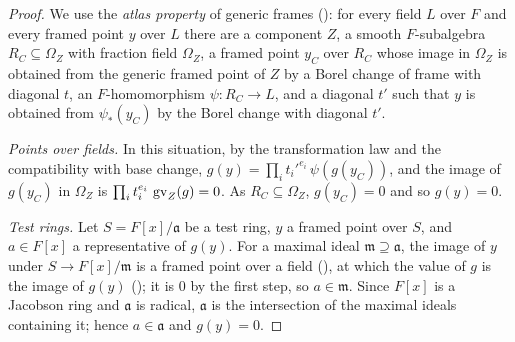 \begin{proof}
We use the \emph{atlas property} of generic frames (): for
every field $L$ over $F$ and every framed point $y$ over $L$ there are a component $Z$, a smooth
$F$-subalgebra $R_C\subseteq\Omega_Z$ with fraction field $\Omega_Z$, a framed point $y_C$ over $R_C$ whose
image in $\Omega_Z$ is obtained from the generic framed point of $Z$ by a Borel change of frame with
diagonal $t$, an $F$-homomorphism $\psi\colon R_C\to L$, and a diagonal $t'$ such that $y$ is obtained from
$\psi_*(y_C)$ by the Borel change with diagonal $t'$.

\emph{Points over fields.} In this situation, by the transformation law and the compatibility with base
change, $g(y)=\prod_it_i'^{e_i}\,\psi(g(y_C))$, and the image of $g(y_C)$ in $\Omega_Z$ is
$\prod_it_i^{e_i}\,\operatorname{gv}_Z(g)=0$. As $R_C\subseteq\Omega_Z$, $g(y_C)=0$ and so $g(y)=0$.

\emph{Test rings.} Let $S=F[x]/\mathfrak a$ be a test ring, $y$ a framed point over $S$, and $a\in F[x]$ a
representative of $g(y)$. For a maximal ideal $\mathfrak m\supseteq\mathfrak a$, the image of $y$ under
$S\to F[x]/\mathfrak m$ is a framed point over a field (), at
which the value of $g$ is the image of $g(y)$ (); it is $0$ by the
first step, so $a\in\mathfrak m$. Since $F[x]$ is a Jacobson ring and $\mathfrak a$ is radical,
$\mathfrak a$ is the intersection of the maximal ideals containing it; hence $a\in\mathfrak a$ and $g(y)=0$.
\end{proof}

